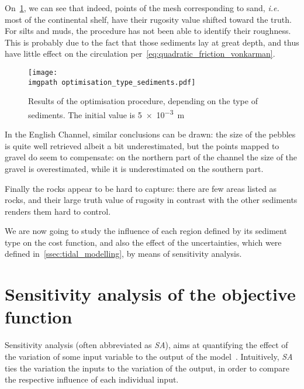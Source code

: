 \documentclass[../../Main_ManuscritThese.tex]{subfiles}
\newcommand\imgpath{/home/victor/acadwriting/Manuscrit/Text/Chapter5/img/}
\begin{document}
On~\cref{fig:optimisation_type_sediments}, we can see that indeed,
points of the mesh corresponding to sand, \emph{i.e.} most of the
continental shelf, have their rugosity value shifted toward the truth.
For silts and muds, the procedure has not been able to identify their
roughness. This is probably due to the fact that those sediments lay
at great depth, and thus have little effect on the circulation
per~\cref{eq:quadratic_friction_vonkarman}.
\begin{figure}[ht]
  \centering
  \texttt{[image: \\imgpath optimisation\_type\_sediments.pdf]}
  \caption{\label{fig:optimisation_type_sediments} Results of the
    optimisation procedure, depending on the type of sediments. The
    initial value is \SI{5e-3}{\meter}}
\end{figure}

In the English Channel, similar conclusions can be drawn: the size of
the pebbles is quite well retrieved albeit a bit
underestimated, but the points mapped to gravel do
seem to compensate: on the northern part of the channel the size of
the gravel is overestimated, while it is underestimated on the
southern part.

Finally the rocks appear to be hard to capture: there are few areas
listed as rocks, and their large truth value of rugosity in contrast
with the other sediments renders them hard to
control.%

We are now going to study the influence of each region defined by its
sediment type on the cost function, and also the effect of the
uncertainties, which were defined in~\cref{ssec:tidal_modelling}, by
means of sensitivity analysis.



\section{Sensitivity analysis of the objective function}
\label{sec:sensitivity-analysis}
Sensitivity analysis (often abbreviated as \emph{SA}), aims at
quantifying the effect of the variation of some input variable to the
output of the model~\cite{iooss_revue_2011,janon_analyse_2012}.
Intuitively, \emph{SA} ties the variation the inputs to
the variation of the output, in order to compare the respective
influence of each individual input.
\end{document}
